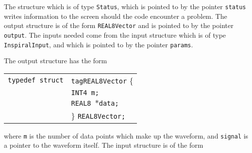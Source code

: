 \documentclass[12pt]{article}
\begin{document}
The structure which is of type \texttt{Status}, which is pointed to by the pointer \texttt{status} writes information to the screen should the code encounter a problem. The output structure is of the form \texttt{REAL8Vector} and is pointed to by the pointer \texttt{output}.
The inputs needed come from the input structure which is of type \texttt{InspiralInput}, and which is pointed to by the pointer \texttt{params}.

The output structure has the form

\vspace{5mm}

\begin{tabular}{ll}
\texttt{typedef struct} & \texttt{tagREAL8Vector} \{ \\
                        & \texttt{INT4 m;} \\
                        & \texttt{REAL8 $\ast$data;}  \\
                        & \} \texttt{REAL8Vector;}
\end{tabular}

\vspace{5mm}

where \texttt{m} is the number of data points which make up the waveform, and \texttt{signal} is a pointer to the waveform itself. The input structure is of the form

\vspace{5mm}
\end{document}

